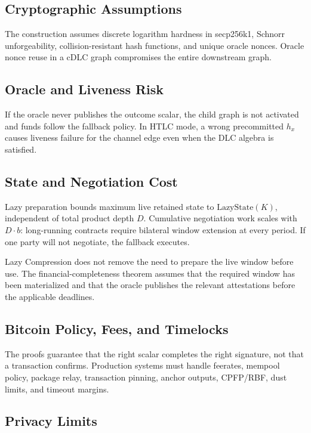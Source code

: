 \documentclass[11pt,a4paper]{article}
\theoremstyle{claimstyle}
\begin{document}
\subsection{Cryptographic Assumptions}

The construction assumes discrete logarithm hardness in secp256k1, Schnorr
unforgeability, collision-resistant hash functions, and unique oracle nonces.
Oracle nonce reuse in a cDLC graph compromises the entire downstream graph.

\subsection{Oracle and Liveness Risk}

If the oracle never publishes the outcome scalar, the child graph is not
activated and funds follow the fallback policy. In HTLC mode, a wrong
precommitted $h_x$ causes liveness failure for the channel edge even when the
DLC algebra is satisfied.

\subsection{State and Negotiation Cost}

Lazy preparation bounds maximum live retained state to $\mathrm{LazyState}(K)$,
independent of total product depth $D$. Cumulative negotiation work scales with
$D \cdot b$: long-running contracts require bilateral window extension at every
period. If one party will not negotiate, the fallback executes.

Lazy Compression does not remove the need to prepare the live window before
use. The financial-completeness theorem assumes that the required window has
been materialized and that the oracle publishes the relevant attestations before
the applicable deadlines.

\subsection{Bitcoin Policy, Fees, and Timelocks}

The proofs guarantee that the right scalar completes the right signature, not
that a transaction confirms. Production systems must handle feerates, mempool
policy, package relay, transaction pinning, anchor outputs, CPFP/RBF, dust
limits, and timeout margins.

\subsection{Privacy Limits}
\end{document}
